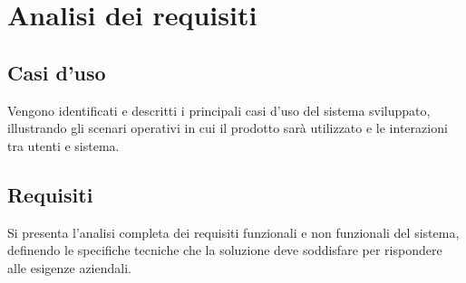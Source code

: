 \section{Analisi dei requisiti}
\subsection{Casi d'uso}
Vengono identificati e descritti i principali casi d'uso del sistema sviluppato, illustrando gli scenari operativi in cui il prodotto sarà utilizzato e le interazioni tra utenti e sistema.
\subsection{Requisiti}
Si presenta l'analisi completa dei requisiti funzionali e non funzionali del sistema, definendo le specifiche tecniche che la soluzione deve soddisfare per rispondere alle esigenze aziendali.